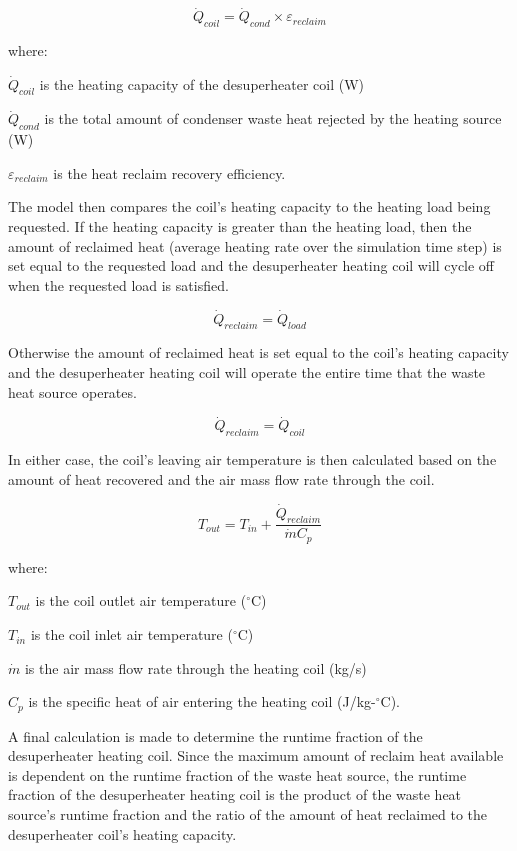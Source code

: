 \begin{equation}
{\dot Q_{coil}} = {\dot Q_{cond}} \times {\varepsilon_{reclaim}}
\end{equation}

where:

\({\dot Q_{coil}}\) is the heating capacity of the desuperheater coil (W)

\({\dot Q_{cond}}\) is the total amount of condenser waste heat rejected by the heating source (W)

\({\varepsilon_{reclaim}}\) is the heat reclaim recovery efficiency.

The model then compares the coil's heating capacity to the heating load being requested. If the heating capacity is greater than the heating load, then the amount of reclaimed heat (average heating rate over the simulation time step) is set equal to the requested load and the desuperheater heating coil will cycle off when the requested load is satisfied.

\begin{equation}
{\dot Q_{reclaim}} = {\dot Q_{load}}
\end{equation}

Otherwise the amount of reclaimed heat is set equal to the coil's heating capacity and the desuperheater heating coil will operate the entire time that the waste heat source operates.

\begin{equation}
{\dot Q_{reclaim}} = {\dot Q_{coil}}
\end{equation}

In either case, the coil's leaving air temperature is then calculated based on the amount of heat recovered and the air mass flow rate through the coil.

\begin{equation}
{T_{out}} = {T_{in}} + \frac{{{{\dot Q}_{reclaim}}}}{{\dot m{C_p}}}
\end{equation}

where:

\({T_{out}}\) is the coil outlet air temperature (\(^{\circ}\)C)

\({T_{in}}\) is the coil inlet air temperature (\(^{\circ}\)C)

\(\dot m\) is the air mass flow rate through the heating coil (kg/s)

\({C_p}\) is the specific heat of air entering the heating coil (J/kg-\(^{\circ}\)C).

A final calculation is made to determine the runtime fraction of the desuperheater heating coil. Since the maximum amount of reclaim heat available is dependent on the runtime fraction of the waste heat source, the runtime fraction of the desuperheater heating coil is the product of the waste heat source's runtime fraction and the ratio of the amount of heat reclaimed to the desuperheater coil's heating capacity.

